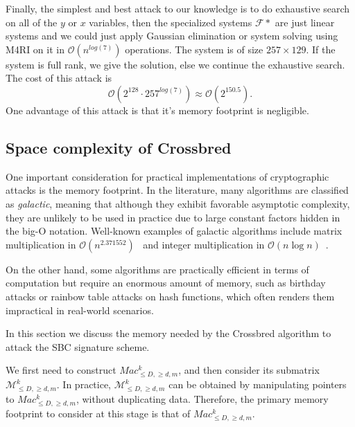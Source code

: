\documentclass[english]{article}
\begin{document}
		Finally, the simplest and best attack to our knowledge is to do exhaustive search on all of the $y$ or $x$ variables, then the specialized systems $\mathcal{F}*$ are just linear systems and we could just apply Gaussian elimination or system solving using M4RI \cite{M4RI} on it in $\mathcal{O}(n^{log(7)})$ operations. The system is of size $257 \times 129$. If the system is full rank, we give the solution, else we continue the exhaustive search. The cost of this attack is 
		$$
		\mathcal{O}(2^{128} \cdot 257^{log(7)}) \approx \mathcal{O}(2^{150.5}).
		$$
		One advantage of this attack is that it's memory footprint is negligible.
		
		\subsection{Space complexity of Crossbred}
		
		One important consideration for practical implementations of cryptographic attacks is the memory footprint. In the literature, many algorithms are classified as \emph{galactic}, meaning that although they exhibit favorable asymptotic complexity, they are unlikely to be used in practice due to large constant factors hidden in the big-O notation. Well-known examples of galactic algorithms include matrix multiplication in $\mathcal{O}(n^{2.371552})$~\cite{WXXZ23} and integer multiplication in $\mathcal{O}(n \log n)$~\cite{HH21}. 
		
		On the other hand, some algorithms are practically efficient in terms of computation but require an enormous amount of memory, such as birthday attacks or rainbow table attacks on hash functions, which often renders them impractical in real-world scenarios.
	
		In this section we discuss the memory needed by the Crossbred algorithm to attack the SBC signature scheme.
		
		We first need to construct $Mac_{\leq D, \geq d, m}^k$, and then consider its submatrix $\mathcal{M}_{\leq D, \geq d, m}^k$. In practice, $\mathcal{M}_{\leq D, \geq d, m}^k$ can be obtained by manipulating pointers to $Mac_{\leq D, \geq d, m}^k$, without duplicating data. Therefore, the primary memory footprint to consider at this stage is that of $Mac_{\leq D, \geq d, m}^k$. 
		
\end{document}
